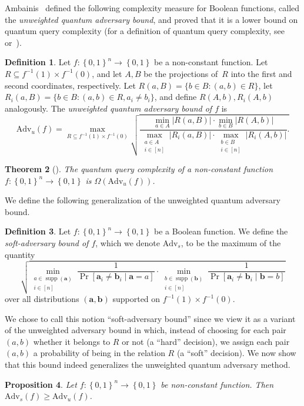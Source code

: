 \documentclass[11pt]{article}
\numberwithin{equation}{section}
\newtheorem{theorem}{Theorem}[section]
\newtheorem{proposition}[theorem]{Proposition}
\theoremstyle{definition}
\newtheorem{definition}[theorem]{Definition}
\theoremstyle{plain}
\theoremstyle{definition}\newtheorem{notation}[theorem]{Notation}\theoremstyle{plain}
\newcommand{\B}{\left\{ 0,1 \right \}}
\renewcommand{\a}{\boldsymbol{a}}
\renewcommand{\b}{\boldsymbol{b}}
\newcommand{\Amb}{\mathrm{Adv}_{u}}
\newcommand{\Am}{\mathrm{Adv}_{s}}
\DeclareMathOperator{\supp}{supp}
\theoremstyle{definition}
\theoremstyle{plain}
\begin{document}
Ambainis~\cite{A02} defined the following complexity measure for
Boolean functions, called the \emph{unweighted quantum adversary bound},
and proved that it is a lower bound on quantum query complexity (for
a definition of quantum query complexity, see~\cite{A02} or~\cite{BW02}).
\begin{definition}
\label{def:ambainis}Let $f\colon\B^{n}\to\B$ be a non-constant function.
Let $R\subseteq f^{-1}(1)\times f^{-1}(0)$, and let $A,B$ be the
projections of~$R$ into the first and second coordinates, respectively.
Let $R(a,B)=\{b\in B:(a,b)\in R\}$, let $R_{i}(a,B)=\{b\in B:(a,b)\in R,a_{i}\neq b_{i}\}$,
and define $R(A,b),R_{i}(A,b)$ analogously. The \emph{unweighted
quantum adversary bound of $f$} is 
\[
\Amb(f)=\max_{R\subseteq f^{-1}(1)\times f^{-1}(0)}\sqrt{\frac{\min_{a\in A}|R(a,B)|\cdot\min_{b\in B}|R(A,b)|}{\max_{\substack{a\in A\\
i\in[n]
}
}|R_{i}(a,B)|\cdot\max_{\substack{b\in B\\
i\in[n]
}
}|R_{i}(A,b)|}.}
\]
\end{definition}

\begin{theorem}[\cite{A02}]
The quantum query complexity of a non-constant function $f\colon\B^{n}\to\B$
is $\Omega(\Amb(f))$. 
\end{theorem}

We define the following generalization of the unweighted quantum adversary
bound.
\begin{definition}
\label{def:soft-ambainis}Let $f\colon\B^{n}\to\B$ be a Boolean function.
%
We define the \emph{soft-adversary bound of $f$}, which we denote $\Am$,
to be the maximum of the quantity 
\[
\sqrt{\min_{\substack{a\in\supp(\a)\\
i\in[n]
}
}\frac{1}{\Pr[\a_{i}\neq\b_{i}\mid\a=a]}\cdot\min_{\substack{b\in\supp(\b)\\
i\in[n]
}
}\frac{1}{\Pr[\a_{i}\neq\b_{i}\mid\b=b]}}
\]
over all distributions $(\a,\b)$ supported on $f^{-1}(1)\times f^{-1}(0)$. 
\end{definition}

We chose to call this notion ``soft-adversary bound'' since we view
it as a variant of the unweighted adversary bound in which, instead
of choosing for each pair $(a,b)$ whether it belongs to $R$ or not
(a ``hard'' decision), we assign each pair $(a,b)$ a probability
of being in the relation $R$ (a ``soft'' decision). We now show
that this bound indeed generalizes the unweighted quantum adversary
method.
\begin{proposition}
\label{prop:Amb-Am}Let $f\colon\B^{n}\to\B$ be non-constant function.
Then $\Am(f)\geq\Amb(f)$. 
\end{proposition}
\end{document}
